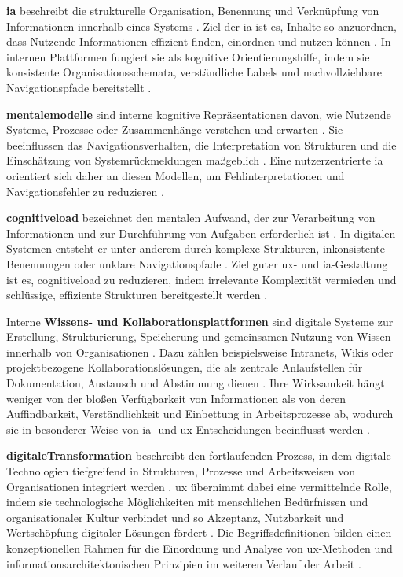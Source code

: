 \textbf{\acrlong{ia}} beschreibt die strukturelle Organisation, Benennung und Verknüpfung von Informationen innerhalb eines Systems \cite{303:Rosenfeld2015}. Ziel der \Gls{ia} ist es, Inhalte so anzuordnen, dass Nutzende Informationen effizient finden, einordnen und nutzen können \cite{303:Rosenfeld2015,201:ArangoIA}. In internen Plattformen fungiert sie als kognitive Orientierungshilfe, indem sie konsistente Organisationsschemata, verständliche Labels und nachvollziehbare Navigationspfade bereitstellt \cite{303:Rosenfeld2015,201:ArangoIA}.

\textbf{\Gls{mentalemodelle}} sind interne kognitive Repräsentationen davon, wie Nutzende Systeme, Prozesse oder Zusammenhänge verstehen und erwarten \cite{905:Norman1983}. Sie beeinflussen das Navigationsverhalten, die Interpretation von Strukturen und die Einschätzung von Systemrückmeldungen maßgeblich \cite{905:Norman1983}. Eine nutzerzentrierte \Gls{ia} orientiert sich daher an diesen Modellen, um Fehlinterpretationen und Navigationsfehler zu reduzieren \cite{303:Rosenfeld2015,905:Norman1983}.

\textbf{\Gls{cognitiveload}} bezeichnet den mentalen Aufwand, der zur Verarbeitung von Informationen und zur Durchführung von Aufgaben erforderlich ist \cite{105:Sweller1988}. In digitalen Systemen entsteht er unter anderem durch komplexe Strukturen, inkonsistente Benennungen oder unklare Navigationspfade \cite{105:Sweller1988}. Ziel guter \Gls{ux}- und \Gls{ia}-Gestaltung ist es, \gls{cognitiveload} zu reduzieren, indem irrelevante Komplexität vermieden und schlüssige, effiziente Strukturen bereitgestellt werden \cite{408:Hassenzahl2010,105:Sweller1988}.

Interne \textbf{Wissens- und Kollaborationsplattformen} sind digitale Systeme zur Erstellung, Strukturierung, Speicherung und gemeinsamen Nutzung von Wissen innerhalb von Organisationen \cite{904:PumacyWikiKM}. Dazu zählen beispielsweise Intranets, Wikis oder projektbezogene Kollaborationslösungen, die als zentrale Anlaufstellen für Dokumentation, Austausch und Abstimmung dienen \cite{904:PumacyWikiKM}. Ihre Wirksamkeit hängt weniger von der bloßen Verfügbarkeit von Informationen als von deren Auffindbarkeit, Verständlichkeit und Einbettung in Arbeitsprozesse ab, wodurch sie in besonderer Weise von \Gls{ia}- und \Gls{ux}-Entscheidungen beeinflusst werden \cite{303:Rosenfeld2015,406:Albers2015,904:PumacyWikiKM}.

\textbf{\Gls{digitaleTransformation}} beschreibt den fortlaufenden Prozess, in dem digitale Technologien tiefgreifend in Strukturen, Prozesse und Arbeitsweisen von Organisationen integriert werden \cite{403:Westerman2014}. \Gls{ux} übernimmt dabei eine vermittelnde Rolle, indem sie technologische Möglichkeiten mit menschlichen Bedürfnissen und organisationaler Kultur verbindet und so Akzeptanz, Nutzbarkeit und Wertschöpfung digitaler Lösungen fördert \cite{408:Hassenzahl2010,403:Westerman2014}. Die Begriffsdefinitionen bilden einen konzeptionellen Rahmen für die Einordnung und Analyse von \Gls{ux}-Methoden und informationsarchitektonischen Prinzipien im weiteren Verlauf der Arbeit \cite{303:Rosenfeld2015,406:Albers2015}.

